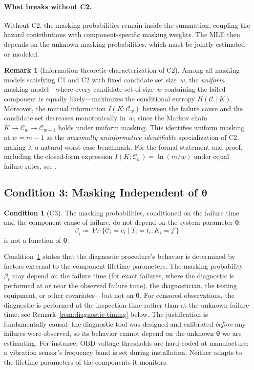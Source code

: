 \documentclass[11pt]{article}
\theoremstyle{definition}
\newtheorem{condition}{Condition}
\newtheorem{remark}{Remark}
\theoremstyle{plain}
\renewcommand{\v}[1]{\boldsymbol{#1}}
\newcommand{\btheta}{\v{\theta}}
\begin{document}
\paragraph{What breaks without C2.}
Without C2, the masking probabilities remain inside the summation, coupling
the hazard contributions with component-specific masking weights.
The MLE then depends on the unknown masking probabilities, which must be
jointly estimated or modeled.

\begin{remark}[Information-theoretic characterization of C2]
\label{rem:c2-entropy}
Among all masking models satisfying C1 and C2 with fixed candidate set
size~$w$, the \emph{uniform} masking model---where every candidate set
of size~$w$ containing the failed component is equally likely---maximizes
the conditional entropy $H(\mathcal{C} \mid K)$.
Moreover, the mutual information $I(K; \mathcal{C}_w)$ between the
failure cause and the candidate set decreases monotonically in~$w$,
since the Markov chain $K \to \mathcal{C}_w \to \mathcal{C}_{w+1}$
holds under uniform masking.
This identifies uniform masking at $w = m-1$ as the
\emph{maximally uninformative identifiable} specialization of C2,
making it a natural worst-case benchmark.
For the formal statement and proof, including the closed-form expression
$I(K; \mathcal{C}_w) = \ln(m/w)$ under equal failure rates, see
\citet{towell2025exponential-series}.
\end{remark}

\subsection{Condition 3: Masking Independent of \texorpdfstring{$\btheta$}{theta}}
\label{sec:c3}

\begin{condition}[C3]
\label{cond:c3}
The masking probabilities, conditioned on the failure time and the
component cause of failure, do not depend on the system parameter
$\btheta$:
\begin{equation}
    \beta_i \coloneqq \Pr\{\mathcal{C}_i = c_i \mid T_i = t_i, K_i = j'\}
\end{equation}
is not a function of $\btheta$.
\end{condition}

Condition~\ref{cond:c3} states that the diagnostic procedure's behavior
is determined by factors external to the component lifetime parameters.
The masking probability $\beta_i$ may depend on the failure time (for
exact failures, where the diagnostic is performed at or near the observed
failure time), the diagnostician, the testing equipment, or other
covariates---but not on $\btheta$.
For censored observations, the diagnostic is performed at the inspection
time rather than at the unknown failure time; see
Remark~\ref{rem:diagnostic-timing} below.
The justification is fundamentally causal: the diagnostic tool was
designed and calibrated \emph{before} any failures were observed, so its
behavior cannot depend on the unknown $\btheta$ we are estimating.
For instance, OBD voltage thresholds are hard-coded at manufacture; a
vibration sensor's frequency band is set during installation.
Neither adapts to the lifetime parameters of the components it monitors.
\end{document}
